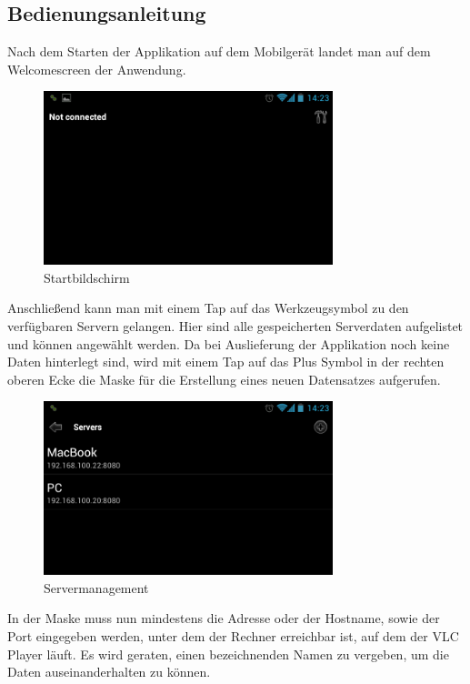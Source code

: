 \documentclass[a4paper,12pt]{article}
\begin{document}
\subsection{Bedienungsanleitung}
Nach dem Starten der Applikation auf dem Mobilgerät landet man auf dem Welcomescreen der Anwendung. 
\begin{figure}[H]
\centering
\includegraphics[width=0.75\textwidth]{Screenshot_1.png}
\caption{Startbildschirm}
\end{figure}
Anschließend kann man mit einem Tap auf das Werkzeugsymbol zu den verfügbaren Servern gelangen. Hier sind alle gespeicherten Serverdaten aufgelistet und können angewählt werden. Da bei Auslieferung der Applikation noch keine Daten hinterlegt sind, wird mit einem Tap auf das Plus Symbol in der rechten oberen Ecke die Maske für die Erstellung eines neuen Datensatzes aufgerufen.
\begin{figure}[H]
\centering
\includegraphics[width=0.75\textwidth]{Screenshot_2.png}
\caption{Servermanagement}
\end{figure}
In der Maske muss nun mindestens die Adresse oder der Hostname, sowie der Port eingegeben werden, unter dem der Rechner erreichbar ist, auf dem der VLC Player läuft. Es wird geraten, einen bezeichnenden Namen zu vergeben, um die Daten auseinanderhalten zu können.
\end{document}
